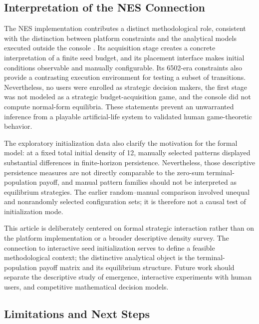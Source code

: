 \documentclass[games,article,submit,moreauthors]{Definitions/mdpi}
\begin{document}
\subsection{Interpretation of the NES Connection}

The NES implementation contributes a distinct methodological role, consistent with the distinction between platform constraints and the analytical models executed outside the console \citep{altice2015,senzio2026nes}. Its acquisition stage creates a concrete interpretation of a finite seed budget, and its placement interface makes initial conditions observable and manually configurable. Its 6502-era constraints also provide a contrasting execution environment for testing a subset of transitions. Nevertheless, no users were enrolled as strategic decision makers, the first stage was not modeled as a strategic budget-acquisition game, and the console did not compute normal-form equilibria. These statements prevent an unwarranted inference from a playable artificial-life system to validated human game-theoretic behavior.

The exploratory initialization data also clarify the motivation for the formal model: at a fixed total initial density of 12, manually selected patterns displayed substantial differences in finite-horizon persistence. Nevertheless, those descriptive persistence measures are not directly comparable to the zero-sum terminal-population payoff, and manual pattern families should not be interpreted as equilibrium strategies. The earlier random--manual comparison involved unequal and nonrandomly selected configuration sets; it is therefore not a causal test of initialization mode.

This article is deliberately centered on formal strategic interaction rather than on the platform implementation or a broader descriptive density survey. The connection to interactive seed initialization serves to define a feasible methodological context; the distinctive analytical object is the terminal-population payoff matrix and its equilibrium structure. Future work should separate the descriptive study of emergence, interactive experiments with human users, and competitive mathematical decision models.

\subsection{Limitations and Next Steps}
\end{document}

